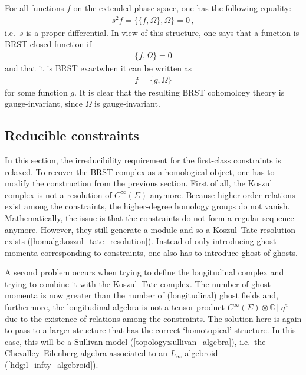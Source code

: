     \begin{property}
        For all functions $f$ on the extended phase space, one has the following equality:
        \begin{gather}
            s^2f = \{\{f,\Omega\},\Omega\} = 0\,,
        \end{gather}
        i.e.~$s$ is a proper differential. In view of this structure, one says that a function is BRST closed function if
        \begin{gather}
            \{f,\Omega\} = 0
        \end{gather}
        and that it is BRST exactwhen it can be written as
        \begin{gather}
            f = \{g,\Omega\}
        \end{gather}
        for some function $g$. It is clear that the resulting BRST cohomology theory is gauge-invariant, since $\Omega$ is gauge-invariant.
    \end{property}

\subsection{Reducible constraints}

    In this section, the irreducibility requirement for the first-class constraints is relaxed. To recover the BRST complex as a homological object, one has to modify the construction from the previous section. First of all, the Koszul complex is not a resolution of $C^\infty(\Sigma)$ anymore. Because higher-order relations exist among the constraints, the higher-degree homology groups do not vanish. Mathematically, the issue is that the constraints do not form a regular sequence anymore. However, they still generate a module and so a Koszul--Tate resolution exists (\cref{homalg:koszul_tate_resolution}). Instead of only introducing ghost momenta corresponding to constraints, one also has to introduce ghost-of-ghosts.

    A second problem occurs when trying to define the longitudinal complex and trying to combine it with the Koszul--Tate complex. The number of ghost momenta is now greater than the number of (longitudinal) ghost fields and, furthermore, the longitudinal algebra is not a tensor product $C^\infty(\Sigma)\otimes\mathbb{C}[\eta^a]$ due to the existence of relations among the constraints. The solution here is again to pass to a larger structure that has the correct `homotopical' structure. In this case, this will be a Sullivan model (\cref{topology:sullivan_algebra}), i.e.~the Chevalley--Eilenberg algebra associated to an $L_\infty$-algebroid (\cref{hdg:l_infty_algebroid}).

